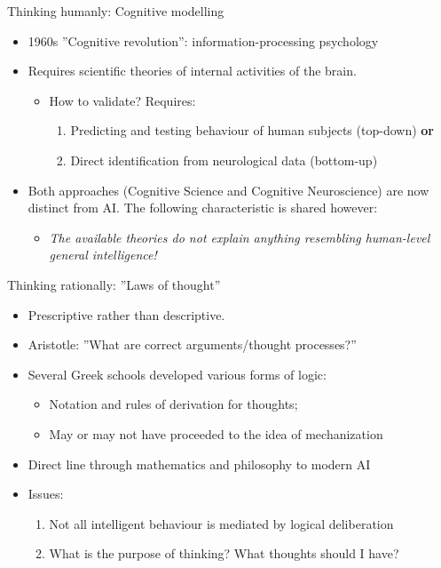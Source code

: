\documentclass[%
pdf,
colorBG,
slideColor,
tcrico,
]{prosper}
\begin{document}
\begin{slide}{Thinking humanly: Cognitive modelling}
\footnotesize 
\begin{itemize}
 \item 1960s ''Cognitive revolution'': information-processing psychology 
 \item Requires scientific theories of internal activities of the brain.
	\begin{itemize}
 	\item  How to validate? Requires: 
		\begin{enumerate}
 		\item Predicting and testing behaviour of human subjects (top-down) \textbf{or}
   		\item Direct identification from neurological data (bottom-up)
		\end{enumerate}
	\end{itemize}
 \item  Both approaches (Cognitive Science and Cognitive Neuroscience) are now distinct from AI. The following characteristic is shared however:
	\begin{itemize}
		\item \textit{The available theories do not explain anything resembling human-level general intelligence!}
	\end{itemize}
\end{itemize}
\end{slide}


\begin{slide}{Thinking rationally: ''Laws of thought''}
\tiny
\begin{itemize}
 \item Prescriptive rather than descriptive.
 \item Aristotle: ''What are correct arguments/thought processes?''
\item Several Greek schools developed various forms of logic: 
	\begin{itemize}
	\item Notation and rules of derivation for thoughts;
	\item May or may not have proceeded to the idea of mechanization
	\end{itemize}
\item Direct line through mathematics and philosophy to modern AI
\item Issues:
	\begin{enumerate}
	\item Not all intelligent behaviour is mediated by logical deliberation
	\item What is the purpose of thinking? What thoughts should I have?
	\end{enumerate}
\end{itemize}
\end{slide}
\end{document}
